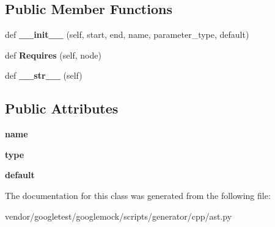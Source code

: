 \subsection*{Public Member Functions}
\begin{DoxyCompactItemize}
\item 
def {\bfseries \+\_\+\+\_\+init\+\_\+\+\_\+} (self, start, end, name, parameter\+\_\+type, default)\hypertarget{classcpp_1_1ast_1_1Parameter_a4fe27f559d44adac9e9b5898ba76c5b3}{}\label{classcpp_1_1ast_1_1Parameter_a4fe27f559d44adac9e9b5898ba76c5b3}

\item 
def {\bfseries Requires} (self, node)\hypertarget{classcpp_1_1ast_1_1Parameter_a4bc5c17a0d606d35be40cb4c2c1a67a6}{}\label{classcpp_1_1ast_1_1Parameter_a4bc5c17a0d606d35be40cb4c2c1a67a6}

\item 
def {\bfseries \+\_\+\+\_\+str\+\_\+\+\_\+} (self)\hypertarget{classcpp_1_1ast_1_1Parameter_aabfbabb3c744a0da4a012ceb4299947a}{}\label{classcpp_1_1ast_1_1Parameter_aabfbabb3c744a0da4a012ceb4299947a}

\end{DoxyCompactItemize}
\subsection*{Public Attributes}
\begin{DoxyCompactItemize}
\item 
{\bfseries name}\hypertarget{classcpp_1_1ast_1_1Parameter_aae0375fb0ded8fa9090feea6bdff2784}{}\label{classcpp_1_1ast_1_1Parameter_aae0375fb0ded8fa9090feea6bdff2784}

\item 
{\bfseries type}\hypertarget{classcpp_1_1ast_1_1Parameter_a5eed090000c41551a10c21f175ad33e3}{}\label{classcpp_1_1ast_1_1Parameter_a5eed090000c41551a10c21f175ad33e3}

\item 
{\bfseries default}\hypertarget{classcpp_1_1ast_1_1Parameter_a4ceae2ac87d82c5542c4e7385eb4c97e}{}\label{classcpp_1_1ast_1_1Parameter_a4ceae2ac87d82c5542c4e7385eb4c97e}

\end{DoxyCompactItemize}


The documentation for this class was generated from the following file\+:\begin{DoxyCompactItemize}
\item 
vendor/googletest/googlemock/scripts/generator/cpp/ast.\+py\end{DoxyCompactItemize}
